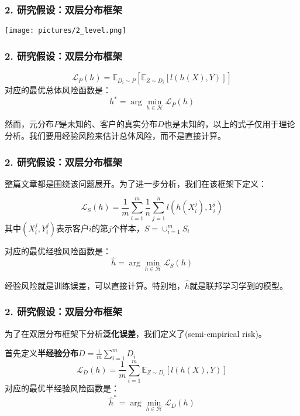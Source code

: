 \documentclass{beamer}
\begin{document}
\begin{frame}
    \frametitle{2. 研究假设：双层分布框架}
    \begin{center}
        \texttt{[image: pictures/2\_level.png]}
    \end{center}
\begin{center}
\pause
\textbf{{\color{red}{问题：未参与用户能不能从联邦学习中获益？}}}
\end{center}
\end{frame}
\begin{frame}
    \frametitle{2. 研究假设：双层分布框架}
    \begin{definition}[总体风险]
        \begin{equation*}
            \mathcal{L}_{P}(h) = \mathbb{E}_{D_{i}\sim P}[\mathbb{E}_{Z\sim D_{i}}[l(h(X),Y)]]
        \end{equation*}
        对应的最优总体风险函数是：
        \begin{equation*}
            h^{*} = \arg\min_{h\in \mathcal{H}}\mathcal{L}_{P}(h)
        \end{equation*}
    \end{definition}
    然而，元分布$P$是未知的、客户的真实分布$D$也是未知的，以上的式子仅用于理论分析。我们要用经验风险来估计总体风险，而不是直接计算。
\end{frame}
\begin{frame}
    \frametitle{2. 研究假设：双层分布框架}
    整篇文章都是围绕该问题展开。为了进一步分析，我们在该框架下定义：
    \begin{definition}[经验风险]
        \begin{equation*}
            \mathcal{L}_{S}(h) = \frac{1}{m}\sum_{i=1}^{m}\frac{1}{n}\sum_{j=1}^{n}l(h(X_{i}^{j}),Y_{i}^{j})
        \end{equation*}
        其中$(X_{i}^{j},Y_{i}^{j})$表示客户$i$的第$j$个样本，$S = \cup_{i=1}^{m}S_{i}$

        对应的最优经验风险函数是：
        \begin{equation*}
            \hat{h} = \arg\min_{h\in \mathcal{H}}\mathcal{L}_{S}(h)
        \end{equation*}
    \end{definition}
    经验风险就是训练误差，可以直接计算。特别地，$\hat{h}$就是联邦学习学到的模型。
\end{frame}
\begin{frame}
    \frametitle{2. 研究假设：双层分布框架}
    为了在双层分布框架下分析\textbf{泛化误差}，我们定义了{\color{red}{半经验风险}}(semi-empirical risk)。
    \begin{definition}[半经验风险]
        首先定义\textbf{半经验分布}$D = \frac{1}{m}\sum_{i=1}^{m}D_{i}$\\
        \begin{equation*}
            \mathcal{L}_{D}(h) = \frac{1}{m}\sum_{i=1}^{m}\mathbb{E}_{Z\sim D_{i}}[l(h(X),Y)]
        \end{equation*}
        对应的最优半经验风险函数是：
        \begin{equation*}
            \hat{h}^{*} = \arg\min_{h\in \mathcal{H}}\mathcal{L}_{D}(h)
        \end{equation*}
    \end{definition}
\end{frame}
\end{document}
